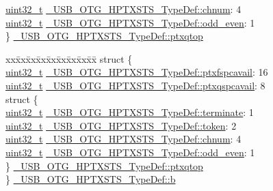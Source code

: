 \begin{DoxyCompactItemize}
\begin{tabbing}
\>\hyperlink{stdint_8h_a435d1572bf3f880d55459d9805097f62}{uint32\_t} \hyperlink{group___u_s_b___o_t_g___d_r_i_v_e_r_ga90c08b176500a5c5a70082a3aae318b2}{\_USB\_OTG\_HPTXSTS\_TypeDef::chnum}: 4\\
\>\hyperlink{stdint_8h_a435d1572bf3f880d55459d9805097f62}{uint32\_t} \hyperlink{group___u_s_b___o_t_g___d_r_i_v_e_r_ga668937b5e6c1ce05ba41a2b1a71dcddd}{\_USB\_OTG\_HPTXSTS\_TypeDef::odd\_even}: 1\\
\} \hyperlink{group___u_s_b___o_t_g___d_r_i_v_e_r_ga27abaf7538c680194e1929d78f1caa40}{\_USB\_OTG\_HPTXSTS\_TypeDef::ptxqtop}\\

\end{tabbing}\item 
\begin{tabbing}
xx\=xx\=xx\=xx\=xx\=xx\=xx\=xx\=xx\=\kill
struct \{\\
\>\hyperlink{stdint_8h_a435d1572bf3f880d55459d9805097f62}{uint32\_t} \hyperlink{group___u_s_b___o_t_g___d_r_i_v_e_r_gac17dfee021a7eb4609cb89ca945f7c21}{\_USB\_OTG\_HPTXSTS\_TypeDef::ptxfspcavail}: 16\\
\>\hyperlink{stdint_8h_a435d1572bf3f880d55459d9805097f62}{uint32\_t} \hyperlink{group___u_s_b___o_t_g___d_r_i_v_e_r_ga59b1038925aee3e4714ff80a613b03d7}{\_USB\_OTG\_HPTXSTS\_TypeDef::ptxqspcavail}: 8\\
\>struct \{\\
\>\>\hyperlink{stdint_8h_a435d1572bf3f880d55459d9805097f62}{uint32\_t} \hyperlink{group___u_s_b___o_t_g___d_r_i_v_e_r_ga881f78bc7a8ff5748d6de34919c171eb}{\_USB\_OTG\_HPTXSTS\_TypeDef::terminate}: 1\\
\>\>\hyperlink{stdint_8h_a435d1572bf3f880d55459d9805097f62}{uint32\_t} \hyperlink{group___u_s_b___o_t_g___d_r_i_v_e_r_gab78bb9c560c5ce625d76f00ff4b70791}{\_USB\_OTG\_HPTXSTS\_TypeDef::token}: 2\\
\>\>\hyperlink{stdint_8h_a435d1572bf3f880d55459d9805097f62}{uint32\_t} \hyperlink{group___u_s_b___o_t_g___d_r_i_v_e_r_ga90c08b176500a5c5a70082a3aae318b2}{\_USB\_OTG\_HPTXSTS\_TypeDef::chnum}: 4\\
\>\>\hyperlink{stdint_8h_a435d1572bf3f880d55459d9805097f62}{uint32\_t} \hyperlink{group___u_s_b___o_t_g___d_r_i_v_e_r_ga668937b5e6c1ce05ba41a2b1a71dcddd}{\_USB\_OTG\_HPTXSTS\_TypeDef::odd\_even}: 1\\
\>\} \hyperlink{group___u_s_b___o_t_g___d_r_i_v_e_r_ga27abaf7538c680194e1929d78f1caa40}{\_USB\_OTG\_HPTXSTS\_TypeDef::ptxqtop}\\
\} \hyperlink{group___u_s_b___o_t_g___d_r_i_v_e_r_gac7c9a4fe4962dfe7e3b99be029c29264}{\_USB\_OTG\_HPTXSTS\_TypeDef::b}\\


\end{tabbing}
\end{DoxyCompactItemize}
